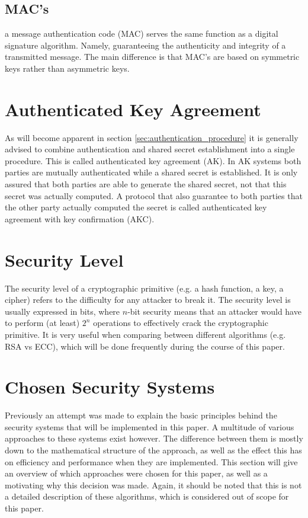 \subsection{MAC's} 
\label{subsec:MAC}
a message authentication code (MAC) serves the same function as a digital signature algorithm. Namely, guaranteeing the authenticity and integrity of a transmitted message. The main difference is that MAC's are based on symmetric keys rather than asymmetric keys. 

\section{Authenticated Key Agreement}
\label{sec:AK}

As will become apparent in section \ref{sec:authentication_procedure} it is generally advised to combine authentication and shared secret establishment into a single procedure. This is called authenticated key agreement (AK). In AK systems both parties are mutually authenticated while a shared secret is established. It is only assured that both parties are able to generate the shared secret, not that this secret was actually computed. A protocol that also guarantee to both parties that the other party actually computed the secret is called authenticated key agreement with key confirmation (AKC).\cite{Blake-Wilson}

\section{Security Level}
\label{sec:security_level}

The security level of a cryptographic primitive (e.g. a hash function, a key, a cipher) refers to the difficulty for any attacker to break it. The security level is usually expressed in bits, where $n$-bit security means that an attacker would have to perform (at least) $2^n$ operations to effectively crack the cryptographic primitive. It is very useful when comparing between different algorithms (e.g. RSA vs ECC), which will be done frequently during the course of this paper.

\section{Chosen Security Systems}
Previously an attempt was made to explain the basic principles behind the security systems that will be implemented in this paper. A multitude of various approaches to these systems exist however. The difference between them is mostly down to the mathematical structure of the approach, as well as the effect this has on efficiency and performance when they are implemented. This section will give an overview of which approaches were chosen for this paper, as well as a motivating why this decision was made. Again, it should be noted that this is not a detailed description of these algorithms, which is considered out of scope for this paper.

